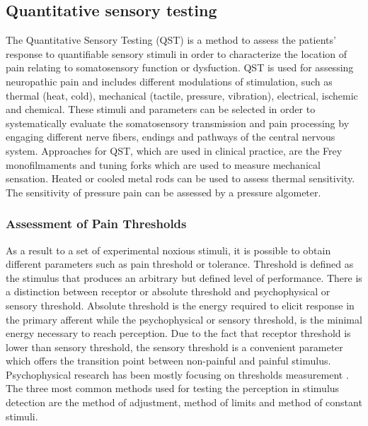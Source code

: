 \subsection{Quantitative sensory testing}
The Quantitative Sensory Testing (QST) is a method to assess the patients' response to quantifiable sensory stimuli in order to characterize the location of pain relating to somatosensory function or dysfuction. QST is used for assessing neuropathic pain and includes different modulations of stimulation, such as thermal (heat, cold), mechanical (tactile, pressure, vibration), electrical, ischemic and chemical. These stimuli and parameters can be selected in order to systematically evaluate the somatosensory transmission and pain processing by engaging different nerve fibers, endings and pathways of the central nervous system. \cite{Fillingim2016} Approaches for QST, which are used in clinical practice, are the Frey monofilmaments and tuning forks which are used to measure mechanical sensation. Heated or cooled metal rods can be used to assess thermal sensitivity. The sensitivity of pressure pain can be assessed by a pressure algometer. \cite{Fillingim2016}


\subsubsection{Assessment of Pain Thresholds}
As a result to a set of experimental noxious stimuli, it is possible to obtain different parameters such as pain threshold or tolerance. Threshold is defined as the stimulus that produces an arbitrary but defined level of performance. There is a distinction between receptor or absolute threshold and psychophysical or sensory threshold. Absolute threshold is the energy required to elicit response in the primary afferent while the psychophysical or sensory threshold, is the minimal energy necessary to reach perception. Due to the fact that receptor threshold is lower than sensory threshold, the sensory threshold is a convenient parameter which offers the transition point between non-painful and painful stimulus. \cite{Yarnitsky2006}
Psychophysical research has been mostly focusing on thresholds measurement \cite{Pelli2010}. The three most common methods used for testing the perception in stimulus detection are the method of adjustment, method of limits and method of constant stimuli.

